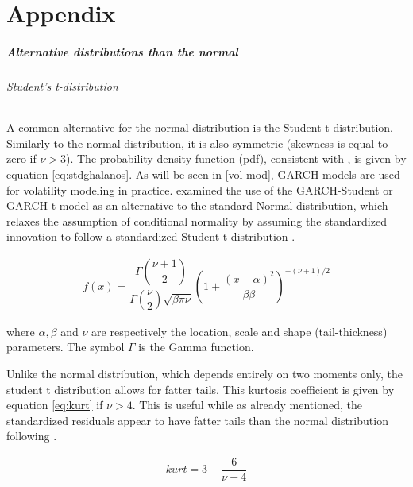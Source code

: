 \documentclass[a4paper, twoside]{templates/ociamthesis}
\begin{document}
\hypertarget{appendix}{%
\chapter{Appendix}\label{appendix}}

\hypertarget{conditional-distributions}{%
\paragraph{Alternative distributions than the normal}\label{conditional-distributions}}

\hypertarget{students-t-distribution}{%
\subparagraph{Student's t-distribution}\label{students-t-distribution}}

\noindent A common alternative for the normal distribution is the Student t distribution. Similarly to the normal distribution, it is also symmetric (skewness is equal to zero if \(\nu > 3\)). The probability density function (pdf), consistent with \textcite{ghalanos2020}, is given by equation \eqref{eq:stdghalanos}. As will be seen in \ref{vol-mod}, GARCH models are used for volatility modeling in practice. \textcite{bollerslev1987} examined the use of the GARCH-Student or GARCH-t model as an alternative to the standard Normal distribution, which relaxes the assumption of conditional normality by assuming the standardized innovation to follow a standardized Student t-distribution \autocite{bollerslev2008}.

\begin{align}
f(x) = \dfrac{\Gamma(\dfrac{\nu+1}{2})}{\Gamma(\dfrac{\nu}{2})\sqrt{\beta \pi \nu}} \left(1+\dfrac{(x-\alpha)^2}{\beta \beta}\right)^{-(\nu+1)/2}
 \label{eq:stdghalanos}
\end{align}

\noindent where \(\alpha, \beta\) and \(\nu\) are respectively the location, scale and shape (tail-thickness) parameters. The symbol \(\Gamma\) is the Gamma function.

\noindent Unlike the normal distribution, which depends entirely on two moments only, the student t distribution allows for fatter tails. This kurtosis coefficient is given by equation \eqref{eq:kurt} if \(\nu>4\). This is useful while as already mentioned, the standardized residuals appear to have fatter tails than the normal distribution following \textcite{bollerslev2008}.

\begin{align}
kurt = 3 + \dfrac{6}{\nu-4}
 \label{eq:kurt}
\end{align}
\end{document}
